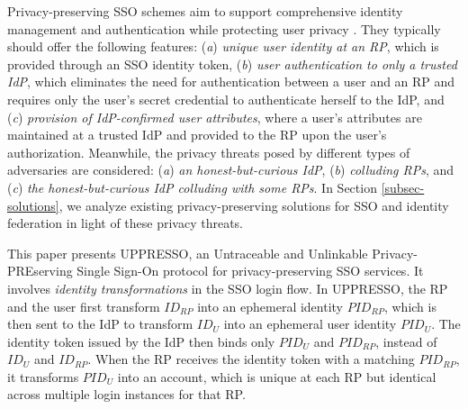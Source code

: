 Privacy-preserving SSO schemes aim to support comprehensive identity management and authentication while protecting user privacy \cite{maler2008venn, NIST2017draft, BrowserID, SPRESSO}.
They typically should offer the following features:
(\emph{a}) \emph{unique user identity at an RP}, which is provided through an SSO identity token,
(\emph{b}) \emph{user authentication to only a trusted IdP}, which eliminates the need for authentication between a user and an RP and requires only the user's secret credential to authenticate herself to the IdP,
and (\emph{c}) \emph{provision of IdP-confirmed user attributes},  where a user's attributes are maintained at a trusted IdP and provided to the RP upon the user's authorization.
 Meanwhile, the privacy threats posed by different types of adversaries are considered:
(\emph{a}) \emph{an honest-but-curious IdP},
(\emph{b}) \emph{colluding RPs},
and (\emph{c}) \emph{the honest-but-curious IdP colluding with some RPs}.
In Section \ref{subsec-solutions}, we analyze existing privacy-preserving solutions for SSO and identity federation in light of these privacy threats.


This paper presents UPPRESSO, an Untraceable and Unlinkable Privacy-PREserving Single Sign-On protocol for privacy-preserving SSO services. It involves {\em identity transformations} in the SSO login flow.
In UPPRESSO, the RP and the user first transform $ID_{RP}$ into an ephemeral identity $PID_{RP}$, which is then sent to the IdP to transform $ID_U$ into an ephemeral user identity $PID_U$.
The identity token issued by the IdP then binds only $PID_U$ and $PID_{RP}$, instead of $ID_U$ and $ID_{RP}$. When the RP receives the identity token with a matching $PID_{RP}$, it transforms $PID_U$ into an account, which is unique at each RP but identical across multiple login instances for that RP.


